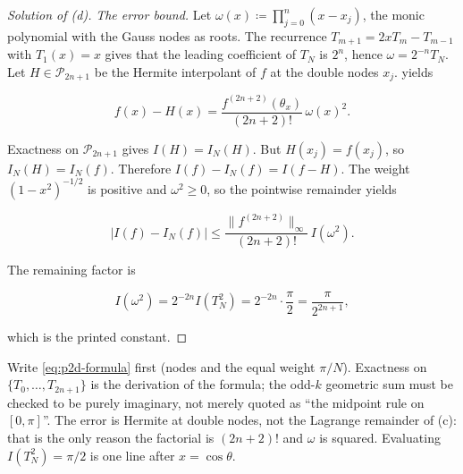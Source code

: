 \begin{proof}[Solution of (d)]
\emph{The error bound.}
Let \(\omega(x)\coloneqq\prod_{j=0}^{n}(x-x_{j})\), the monic polynomial with the Gauss nodes as roots. The recurrence \(T_{m+1}=2xT_{m}-T_{m-1}\) with \(T_{1}(x)=x\) gives that the leading coefficient of \(T_{N}\) is \(2^{n}\), hence \(\omega=2^{-n}T_{N}\). Let \(H\in\mathcal{P}_{2n+1}\) be the Hermite interpolant of \(f\) at the double nodes \(x_{j}\).  yields

\[
f(x)-H(x)
=
\frac{f^{(2n+2)}(\theta_{x})}{(2n+2)!}\,\omega(x)^{2}.
\]

Exactness on \(\mathcal{P}_{2n+1}\) gives \(I(H)=I_{N}(H)\). But \(H(x_{j})=f(x_{j})\), so \(I_{N}(H)=I_{N}(f)\). Therefore \(I(f)-I_{N}(f)=I(f-H)\). The weight \((1-x^{2})^{-1/2}\) is positive and \(\omega^{2}\ge 0\), so the pointwise remainder yields

\[
\bigl|I(f)-I_{N}(f)\bigr|
\le
\frac{\|f^{(2n+2)}\|_{\infty}}{(2n+2)!}\,I(\omega^{2}).
\]

The remaining factor is

\[
I(\omega^{2})
=
2^{-2n}I(T_{N}^{2})
=
2^{-2n}\cdot\frac{\pi}{2}
=
\frac{\pi}{2^{2n+1}},
\]

which is the printed constant.
\end{proof}

\begin{examnote}
\label{examnote:p2d-script}
Write \eqref{eq:p2d-formula} first (nodes and the equal weight \(\pi/N\)). Exactness on \(\{T_{0},\ldots,T_{2n+1}\}\) is the derivation of the formula; the odd-\(k\) geometric sum must be checked to be purely imaginary, not merely quoted as ``the midpoint rule on \([0,\pi]\)''. The error is Hermite at double nodes, not the Lagrange remainder of (c): that is the only reason the factorial is \((2n+2)!\) and \(\omega\) is squared. Evaluating \(I(T_{N}^{2})=\pi/2\) is one line after \(x=\cos\theta\).
\end{examnote}
